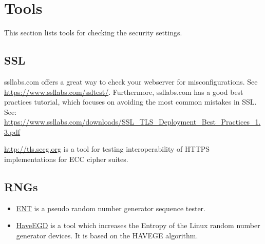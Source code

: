 \section{Tools}

This section lists tools for checking the security settings.

\subsection{SSL}

ssllabs.com offers a great way to check your webserver for misconfigurations. See \url{https://www.ssllabs.com/ssltest/}.
Furthermore, ssllabs.com has a good best practices tutorial, which focuses on avoiding the most common mistakes in SSL.
See: \url{https://www.ssllabs.com/downloads/SSL_TLS_Deployment_Best_Practices_1.3.pdf}

\url{http://tls.secg.org} is a tool for testing interoperability of HTTPS implementations for ECC cipher suites.

\subsection{RNGs}

\begin{itemize}
\item \href{http://www.fourmilab.ch/random/}{ENT} is a pseudo random number generator sequence tester.  
\item \href{http://www.issihosts.com/haveged/}{HaveEGD} is a tool which increases the Entropy of the Linux random number generator devices. It is based on the HAVEGE algorithm.
\end{itemize}



